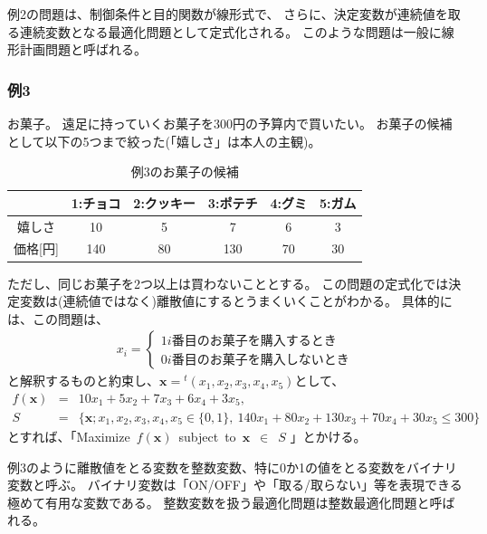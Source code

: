 \documentclass[12pt]{jarticle}
\begin{document}
例2の問題は、制御条件と目的関数が線形式で、
さらに、決定変数が連続値を取る連続変数となる最適化問題として定式化される。
このような問題は一般に線形計画問題と呼ばれる。

\clearpage
\subsubsection*{例3}
お菓子。
遠足に持っていくお菓子を300円の予算内で買いたい。
お菓子の候補として以下の5つまで絞った(「嬉しさ」は本人の主観)。

\begin{table}[htb]
    \begin{center}
        \caption{例3のお菓子の候補}
        \begin{tabular}{|c|c|c|c|c|c|}
            \hline
                     & 1:チョコ & 2:クッキー & 3:ポテチ & 4:グミ & 5:ガム \\
            \hline
            嬉しさ   & 10       & 5          & 7        & 6      & 3      \\
            価格[円] & 140      & 80         & 130      & 70     & 30     \\
            \hline
        \end{tabular}
    \end{center}
\end{table}
ただし、同じお菓子を2つ以上は買わないこととする。
この問題の定式化では決定変数は(連続値ではなく)離散値にするとうまくいくことがわかる。
具体的には、この問題は、
\begin{eqnarray}
    x_i=\left\{
    \begin{array}{l}
        1　i番目のお菓子を購入するとき \\
        0　i番目のお菓子を購入しないとき
    \end{array}
    \right. \nonumber
\end{eqnarray}
と解釈するものと約束し、$\boldsymbol{x}={}^t(x_1,x_2,x_3,x_4,x_5)$として、
\begin{eqnarray}
    f(\boldsymbol{x})&=&10x_1+5x_2+7x_3+6x_4+3x_5, \nonumber \\
    S&=&\{ \boldsymbol{x};x_1,x_2,x_3,x_4,x_5 \in \{0,1\},\ 140x_1+80x_2+130x_3+70x_4+30x_5\leq 300\}\nonumber
\end{eqnarray}
とすれば、「Maximize\ $f(\boldsymbol{x})$\ subject\ to\ $\boldsymbol{x}$\ $\in$\ $S$ 」とかける。



例3のように離散値をとる変数を整数変数、特に0か1の値をとる変数をバイナリ変数と呼ぶ。
バイナリ変数は「ON/OFF」や「取る/取らない」等を表現できる極めて有用な変数である。
整数変数を扱う最適化問題は整数最適化問題と呼ばれる。
\end{document}
